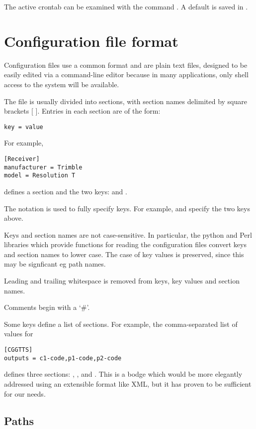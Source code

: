 The active crontab can be examined with the command . 
A default  is saved in . 

\section{Configuration file format \label{sConfigFileFormat}}

Configuration files use a common format and are plain text files, designed to be easily edited via a command-line
editor because in many applications, only shell access to the system will be available.

The file is usually divided into sections, with section names delimited by square brackets [ ]. Entries in each section
are of the form:
\begin{lstlisting}
key = value
\end{lstlisting}
For example,
\begin{lstlisting}
[Receiver]
manufacturer = Trimble
model = Resolution T
\end{lstlisting}
defines a section  and the two keys:  and . 

The notation  is used to fully specify keys. For example,
 and  specify the two keys above.

Keys and section names are not case-sensitive. In particular, the python and Perl libraries
which provide functions for reading the configuration files convert keys and section names to lower case.
The case of key values is preserved, since this may be signficant eg path names.

Leading and trailing whitespace is removed from keys, key values and section names.

Comments begin with a `\#'. 

Some keys define a list of sections. 
For example, the comma-separated list of values for  
\begin{lstlisting}
[CGGTTS]
outputs = c1-code,p1-code,p2-code
\end{lstlisting}
defines three sections: , , and .
This is a bodge which would be more elegantly addressed using an extensible format like XML, 
but it has proven to be sufficient for our needs.

\subsection{Paths} \label{s:ConfigFilePaths}

